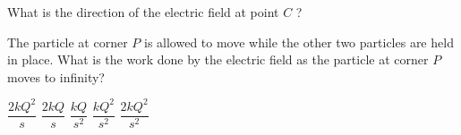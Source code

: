 \begin{questions}\setcounter{question}{1}\question
What is the direction of the electric field at point $C$ ?

\begin{oneparchoices}
\choice {}
\choice {}
\choice {}
\choice {}
\choice {}
\end{oneparchoices}\end{questions}

\begin{questions}\setcounter{question}{2}\question
The particle at corner $P$ is allowed to move while the other two particles are held in place. What is the work done by the electric field as the particle at corner $P$ moves to infinity?

\begin{oneparchoices}
\choice $\dfrac{2 k Q^{2}}{s}$
\choice $\dfrac{2 k Q}{s}$
\choice $\dfrac{k Q}{s^{2}}$
\choice $\dfrac{k Q^{2}}{s^{2}}$
\choice $\dfrac{2 k Q^{2}}{s^{2}}$
\end{oneparchoices}\end{questions}

